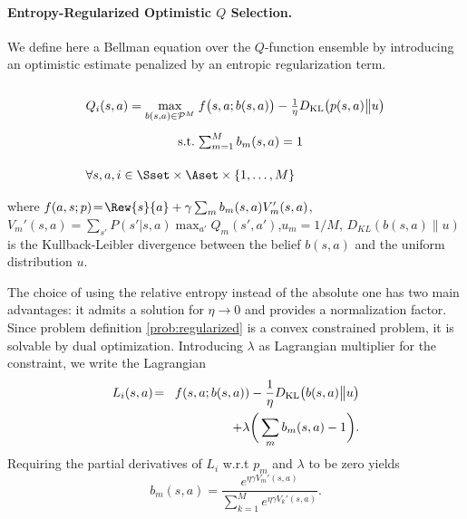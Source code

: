 \paragraph{Entropy-Regularized Optimistic $Q$ Selection.}
We define here a Bellman equation over the $Q$-function ensemble by introducing an optimistic estimate penalized by an entropic regularization term.
\begin{probdef}
	\begin{equation}
	\arraycolsep=1.4pt\def\arraystretch{2.2}
	\begin{array}{rrclcl}
\displaystyle Q_i(s,a) = \max_{b(s,a) \in \mathcal{P}^M} & \multicolumn{3}{l}{f\big(s,a;b(s,a)\big)-\frac{1}{\eta}D_{\mathrm{KL}}\big(p(s,a)\big{\|}u\big) } \\
	\textrm{s.t.} & \sum_{m=1}^{M} b_m(s,a) & = & 1 \\
	\multicolumn{4}{l}{ \forall s,a,i \in \Sset \times \Aset \times \{1,\dots,M\}}
	\end{array}\nonumber
	\end{equation}
	where $f(a,s;p)\! =\! \Rew{s}{a} + \gamma \sum_m{b}_m(s,a)V_m'(s,a)$, $V_m'(s,a) \! = \! \sum_{s'} P(s'|s,a)\max_{a'}Q_m(s',a')$,$u_m  =  1/M$, $D_{KL}(b(s,a)\| u)$ is the Kullback-Leibler divergence between the belief $b(s,a)$ and the uniform distribution $u$.
	\label{prob:regularized}
\end{probdef}
The choice of using the relative entropy instead of the absolute one has two main advantages: it admits a solution for $\eta \to 0$ and provides a normalization factor.
Since problem definition \ref{prob:regularized} is a convex constrained problem, it is solvable by dual optimization. Introducing $\lambda$ as Lagrangian multiplier for the constraint, we write the Lagrangian
\begin{eqnarray}
L_i(s,a) \!&=& \!f(s,a; b(s,a)) -\frac{1}{\eta}D_{\mathrm{KL}}\big(b(s,a)\big{\|}u\big)\nonumber \\ && + \lambda\bigg(\sum_m b_m(s,a) - 1\bigg). \label{lagrangian}
\end{eqnarray}
Requiring the partial derivatives of $L_i$ w.r.t $p_m$ and $\lambda$ to be zero yields 
\begin{equation}
b_m(s,a) = \frac{e^{\eta  \gamma V_m'(s,a)}}{\sum_{k=1}^{M} e^{\eta \gamma   V_k'(s,a)}}\label{pm}.
\end{equation} 
